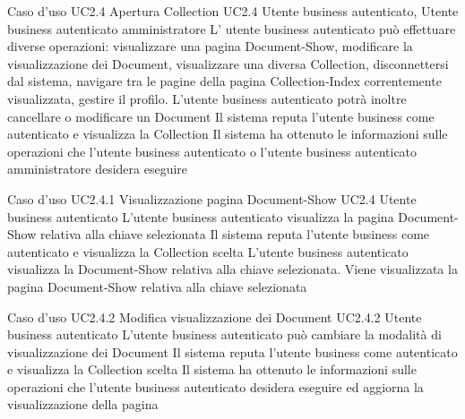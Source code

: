 \UCtitle
{Caso d'uso UC2.4}
{Apertura Collection}
\UC
{UC2.4}
{Utente business autenticato, Utente business autenticato amministratore}
{L’ utente business autenticato può effettuare diverse operazioni: visualizzare una pagina Document-Show, modificare la visualizzazione dei Document, visualizzare una diversa Collection, disconnettersi dal sistema, navigare tra le pagine della pagina Collection-Index correntemente visualizzata,  gestire il profilo. L'utente business autenticato  potrà inoltre cancellare o modificare un Document}
{Il sistema reputa l'utente business come autenticato e visualizza la Collection}
\post
{Il sistema ha ottenuto le informazioni sulle operazioni che l'utente business autenticato o l'utente business autenticato amministratore desidera eseguire}



\UCtitle
{Caso d'uso UC2.4.1}
{Visualizzazione pagina Document-Show}
\UC
{UC2.4}
{Utente business autenticato}
{L'utente business autenticato visualizza la pagina Document-Show relativa alla chiave selezionata}
{Il sistema reputa l'utente business come autenticato e visualizza la Collection scelta}
\scenario
{L'utente business autenticato visualizza la Document-Show relativa alla chiave selezionata.}
\post
{Viene visualizzata la pagina Document-Show relativa alla chiave selezionata}


\UCtitle
{Caso d'uso UC2.4.2}
{Modifica visualizzazione dei Document}
\UC
{UC2.4.2}
{Utente business autenticato}
{L'utente business autenticato può cambiare la modalità di visualizzazione dei Document}
{Il sistema reputa l'utente business come autenticato e visualizza la Collection scelta}
\post
{Il sistema ha ottenuto le informazioni sulle operazioni che l'utente business autenticato desidera eseguire ed aggiorna la visualizzazione della pagina}

